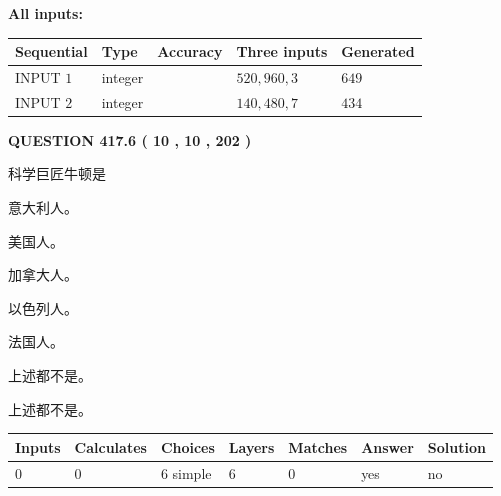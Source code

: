 \documentclass{ctexart}
\begin{document}
   
   
   
\noindent\vspace{0.1in}\hspace{-0.08in} {\textbf{\Large{All inputs: }}}
   
   
  
  
\noindent\begin{tabular}{|l|l|l|l|l|}
\hline
 Sequential & Type & Accuracy & Three inputs & Generated \\ 
\hline
 
 
  INPUT $  1 $ & integer &  & $
 520
 , 
 960
 , 
 3
 $ & $ 649 $ 
 \\  \hline  
 
 
  INPUT $  2 $ & integer &  & $
 140
 , 
 480
 , 
 7
 $ & $ 434 $ 
 \\  \hline  
 \end{tabular}
   
   
  
\vspace{0.2in}
  
{\textbf{\Large{QUESTION
417.6 
 ( 10 , 10 , 202 )
}}}
  
  
科学巨匠牛顿是
 
 
意大利人。
 
 
美国人。
 
 
加拿大人。
 
 
以色列人。
 
 
法国人。
 
 
 上述都不是。
 
 
\noindent{}
 
 
 上述都不是。
 
 
\noindent{}
 
 
   
   
   
   
\noindent\begin{tabular}{|l|l|l|l|l|l|l|}
 \hline
Inputs & Calculates & Choices & Layers & Matches & Answer & Solution \\ \hline
 0  & 
 0  & 
 6
  simple  
  & 
 6  & 
 0  & 
  yes & 
  no 
  \\ \hline
 \end{tabular}
   
\end{document}
